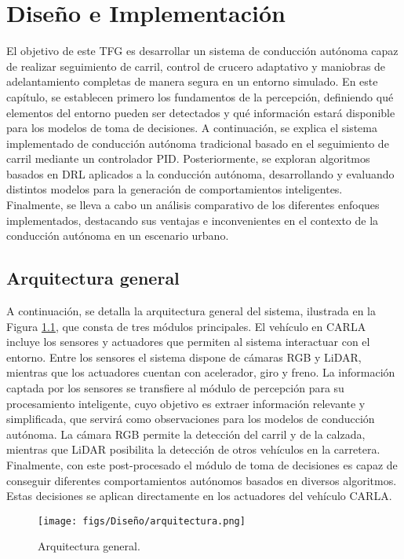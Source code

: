 \chapter{Diseño e Implementación}
\label{cap:capitulo4}

El objetivo de este \ac{TFG} es desarrollar un sistema de conducción autónoma capaz de realizar seguimiento de carril, control de crucero adaptativo y maniobras de adelantamiento completas de manera segura en un entorno simulado. En este capítulo, se establecen primero los fundamentos de la percepción, definiendo qué elementos del entorno pueden ser detectados y qué información estará disponible para los modelos de toma de decisiones. A continuación, se explica el sistema implementado de conducción autónoma tradicional basado en el seguimiento de carril mediante un controlador \ac{PID}. Posteriormente, se exploran algoritmos basados en \ac{DRL} aplicados a la conducción autónoma, desarrollando y evaluando distintos modelos para la generación de comportamientos inteligentes. Finalmente, se lleva a cabo un análisis comparativo de los diferentes enfoques implementados, destacando sus ventajas e inconvenientes en el contexto de la conducción autónoma en un escenario urbano.

\section{Arquitectura general}

A continuación, se detalla la arquitectura general del sistema, ilustrada en la Figura \ref{fig:arch}, que consta de tres módulos principales. El vehículo en CARLA incluye los sensores y actuadores que permiten al sistema interactuar con el entorno. Entre los sensores el sistema dispone de cámaras RGB y \ac{LiDAR}, mientras que los actuadores cuentan con acelerador, giro y freno. La información captada por los sensores se transfiere al módulo de percepción para su procesamiento inteligente, cuyo objetivo es extraer información relevante y simplificada, que servirá como observaciones para los modelos de conducción autónoma. La cámara RGB permite la detección del carril y de la calzada, mientras que \ac{LiDAR} posibilita la detección de otros vehículos en la carretera. Finalmente, con este post-procesado el módulo de toma de decisiones es capaz de conseguir diferentes comportamientos autónomos basados en diversos algoritmos. Estas decisiones se aplican directamente en los actuadores del vehículo CARLA.

\begin{figure}[ht]
  \centering
  \texttt{[image: figs/Diseño/arquitectura.png]}
  \caption{Arquitectura general.}
  \label{fig:arch}
\end{figure}

